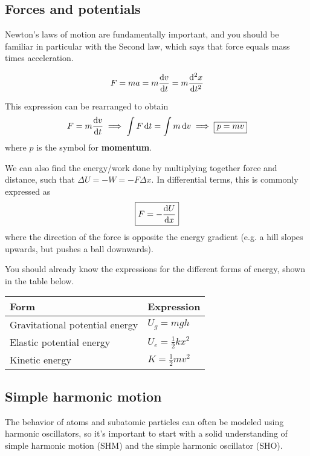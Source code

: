 \subsection{Forces and potentials}

Newton's laws of motion are fundamentally important, and you should be familiar in particular with the Second law, which says that force equals mass times acceleration.
\begin{tcolorbox}[title=Newton's Second law] \vspace{-2ex}
\[ F = ma = m \dv{v}{t} = m\dv[2]{x}{t} \]
\end{tcolorbox} 

This expression can be rearranged to obtain 
\begin{equation*}
	F = m\dv{v}{t} \implies \int F\dd{t} = \int m\dd{v} \implies \boxed{p = mv}
\end{equation*}
where $p$ is the symbol for \textbf{momentum}. \par 

We can also find the energy/work done by multiplying together force and distance, such that $\Delta U = -W = -F \Delta x$. In differential terms, this is commonly expressed as 
\begin{equation}
\boxed{F = -\dv{U}{x}} \label{eq:FdU}
\end{equation}
where the direction of the force is opposite the energy gradient (e.g. a hill slopes upwards, but pushes a ball downwards). \par 

You should already know the expressions for the different forms of energy, shown in the table below. \par 
\begin{table}[!h]
	\renewcommand{\arraystretch}{1.2}
	\centering 
	\begin{tabular}{ll}
		\textbf{Form} & \textbf{Expression} \\ \midrule 
		Gravitational potential energy & $U_g = mgh$ \\ 
		Elastic potential energy & $U_e = \frac{1}{2}kx^2$ \\ 
		Kinetic energy & $K = \frac{1}{2}mv^2$
	\end{tabular}
\end{table} 


\subsection{Simple harmonic motion} \label{sec:shm}
The behavior of atoms and subatomic particles can often be modeled using harmonic oscillators, so it's important to start with a solid understanding of simple harmonic motion (SHM) and the simple harmonic oscillator (SHO). 

